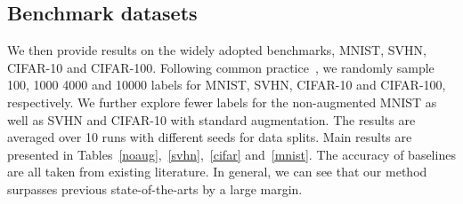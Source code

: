 \documentclass[10pt,twocolumn,letterpaper]{article}
\begin{document}
\begin{table*}[t]
	\caption{Error rates (\%) on CIFAR-10 with standard augmentation, averaged over $10$ runs.}
	\label{cifar}\vspace{-.2cm}
	\centering
	\vspace{-.3cm}
\end{table*}
\subsection{Benchmark datasets}
\label{sec:benchmark}

We then provide results on the widely adopted benchmarks, MNIST, SVHN, CIFAR-10 and CIFAR-100. Following common practice~\cite{rasmus2015semi,salimans2016improved}, we randomly sample 100, 1000 4000 and 10000 labels for MNIST, SVHN, CIFAR-10 and CIFAR-100, respectively. We further explore fewer labels for the non-augmented MNIST as well as SVHN and CIFAR-10 with standard augmentation. The results are averaged over 10 runs with different seeds for data splits. Main results are presented in Tables~\ref{noaug},~\ref{svhn},~\ref{cifar} and~\ref{mnist}. The accuracy of baselines are all taken from existing literature. In general, we can see that our method surpasses previous state-of-the-arts by a large margin.
\end{document}
